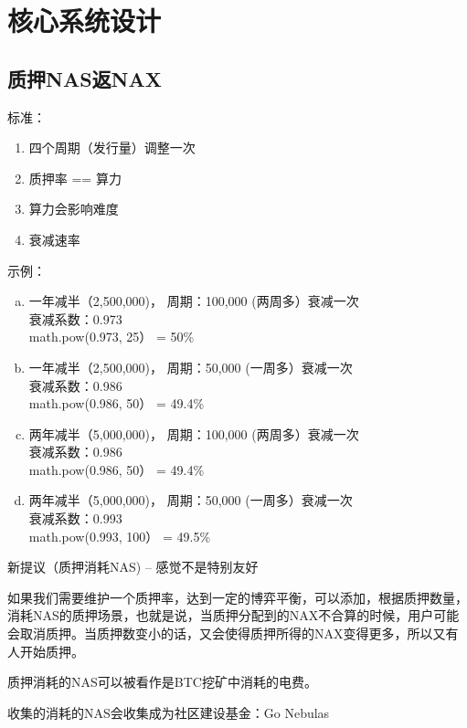 \section{核心系统设计}

\subsection{质押NAS返NAX}
标准：
\begin{enumerate}
\item 四个周期（发行量）调整一次
\item 质押率 == 算力
\item 算力会影响难度
\item 衰减速率
\end{enumerate}

示例：
\begin{enumerate}[a.]

\item 一年减半（2,500,000)， 周期：100,000 (两周多）衰减一次\\
衰减系数：0.973\\
math.pow(0.973, 25） = 50\%

\item 一年减半（2,500,000)， 周期：50,000 (一周多）衰减一次\\
衰减系数：0.986\\
math.pow(0.986, 50） = 49.4\%

\item 两年减半（5,000,000)， 周期：100,000 (两周多）衰减一次\\
衰减系数：0.986\\
math.pow(0.986, 50） = 49.4\%

\item 两年减半（5,000,000)， 周期：50,000 (一周多）衰减一次\\
衰减系数：0.993\\
math.pow(0.993, 100） = 49.5\%

\end{enumerate}

新提议（质押消耗NAS) -- 感觉不是特别友好

如果我们需要维护一个质押率，达到一定的博弈平衡，可以添加，根据质押数量，消耗NAS的质押场景，也就是说，当质押分配到的NAX不合算的时候，用户可能会取消质押。当质押数变小的话，又会使得质押所得的NAX变得更多，所以又有人开始质押。

质押消耗的NAS可以被看作是BTC挖矿中消耗的电费。

收集的消耗的NAS会收集成为社区建设基金：Go Nebulas

